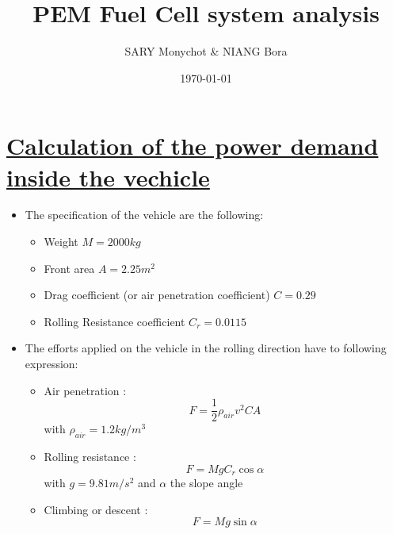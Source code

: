 \documentclass[12pt,a4paper]{article}
\numberwithin{equation}{section}
\begin{document}
	\title{\textbf{PEM Fuel Cell system analysis }}
	\author{SARY Monychot \& NIANG Bora }
	\date{\today}
	\maketitle
	\tableofcontents
		\newpage
	\section{\underline{Calculation of the power demand inside the vechicle}}
	\begin{itemize}
	 \item The specification of the vehicle are the following:
	
	\begin{itemize}
		\item  Weight $M = 2000 kg$
		\item Front area $A = 2.25  m^2$
		\item Drag coefficient (or air penetration coefficient) $C = 0.29$ 
		\item Rolling Resistance coefficient $C_r = 0.0115$
		
	\end{itemize}
	
	\item The efforts applied on the vehicle in the rolling direction have to following expression:
	
	\begin{itemize}
		\item Air penetration : 
		\begin{equation}
				F = \frac{1}{2}\rho_{air}v^2CA  \label{eq1}
		\end{equation} with $\rho_{air} = 1.2    kg/m^3$
		\item Rolling resistance :	
		\begin{equation}
			 F = MgC_r\cos{\alpha} \label{eq2}
		\end{equation}with $g = 9.81 m/s^2$ and $\alpha$ the slope angle
		\item Climbing or descent : 
		\begin{equation}
			F = Mg\sin{\alpha} \label{eq3}
		\end{equation} 
		
	\end{itemize}
	\end{itemize}
	
\end{document}
